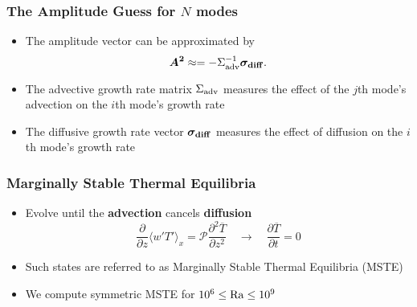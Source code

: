 \begin{frame}[fragile]
    \frametitle{The Amplitude Guess for $N$ modes}
    \begin{itemize}
        \item The amplitude vector can be approximated by
        \begin{equation}
            \vec{A^2} \approx = -\Sigma_{\rm{adv}}^{-1} \vec{\sigma_{\rm{diff}}}.
            \label{EQ:AN_approx}
        \end{equation}
        \item The advective growth rate matrix $\Sigma_{\rm{adv}}$ measures the effect of the $j$th mode's advection on the $i$th mode's growth rate\newline

        \item The diffusive growth rate vector $\vec{\sigma_{\rm{diff}}}$ measures the effect of diffusion on the $i$th mode's growth rate
    \end{itemize}
    
\end{frame}
\begin{frame}[fragile]
    \frametitle{Marginally Stable Thermal Equilibria}
    \begin{itemize}
        \item Evolve until the \textbf{advection} cancels \textbf{diffusion}
        \begin{equation}
            \frac{\partial}{\partial z} \langle w'T' \rangle_x = \mathcal{P} \frac{\partial^2 \overline{T}}{\partial z^2} \quad \longrightarrow \quad \frac{\partial \overline{T}}{\partial t} = 0
        \end{equation}

        \item Such states are referred to as Marginally Stable Thermal Equilibria (MSTE)\newline
        
        \item We compute symmetric MSTE for $10^6 \leq \rm{Ra}\leq 10^9$

    \end{itemize}
\end{frame}